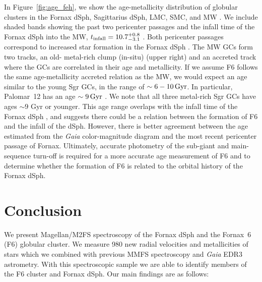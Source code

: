 \documentclass[twocolumn]{aastex63}
\begin{document}
In Figure~\ref{fig:age_feh}, we show the age-metallicity distribution of  globular clusters in the Fornax dSph, Sagittarius dSph, LMC, SMC, and MW \citep[age measurements are from][]{deBoer2016A&A...590A..35D, Kruijssen2019MNRAS.486.3180K, Song2021MNRAS.504.4160S}.
We include shaded bands showing the past two pericenter passages \citep{Rusakov2021MNRAS.502..642R} and the infall time of the Fornax dSph into the MW, $t_{\rm infall} = 10.7_{-3.1}^{+0.8}$ \citep{Fillingham2019arXiv190604180F}. Both pericenter passages correspond to increased star formation in the Fornax dSph \citep{Rusakov2021MNRAS.502..642R}.
The MW GCs form two tracks, an old- metal-rich clump (in-situ) (upper right) and an accreted track where the GCs are correlated in their age and metallicity.
If we assume F6 follows the same age-metallicity  accreted relation as the MW, we would expect an age similar to the young Sgr GCs,  in the range of  $\sim6-10\mathrm{\,Gyr}$.
In particular, Palomar~12 has an age $\sim9\mathrm{\,Gyr}$ \citep{Kruijssen2019MNRAS.486.3180K}.  We note that all three metal-rich Sgr GCs have ages $\sim9$ Gyr or younger. 
This age range overlaps with the infall time of the Fornax dSph \citep{Fillingham2019arXiv190604180F}, and suggests there could be a relation between the formation of F6 and the infall of the dSph.
However, there is better agreement between the age estimated from the {\it Gaia} color-magnitude diagram and  the most recent pericenter passage of Fornax.
Ultimately, accurate photometry of the sub-giant and main-sequence turn-off is required for a more accurate age measurement of F6 and to determine whether the formation of F6 is related to the orbital history of the Fornax dSph. 





\section{Conclusion}
\label{label:conclusion}

We present Magellan/M2FS spectroscopy of the Fornax dSph and the Fornax~6 (F6) globular cluster.
We measure 980 new radial velocities and metallicities of stars which we combined with previous MMFS spectroscopy \citep{Walker2009AJ....137.3100W} and {\it Gaia} EDR3 astrometry.
With this spectroscopic sample we are able to identify members of the F6 cluster and Fornax dSph.
Our main findings are as follows:
\end{document}
